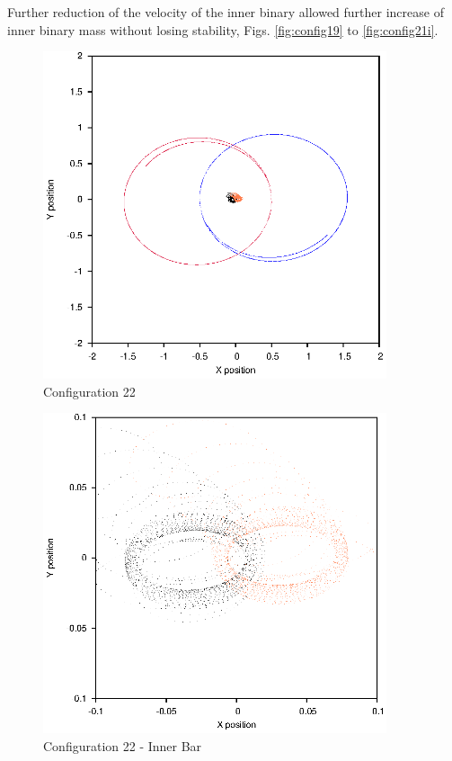 \documentclass[a4paper,12pt]{article}
\begin{document}
Further reduction of the velocity of the inner binary allowed further increase of inner binary mass without losing stability, Figs. \ref{fig:config19} to \ref{fig:config21i}.

\begin{figure}[H]
\centering
\includegraphics[width=0.9\textwidth]{./2017results/1-1-1-05/Orbit.eps}
\caption{Configuration 22}
\label{fig:config22}
\end{figure}
\begin{figure}[H]
\centering
\includegraphics[width=0.9\textwidth]{./2017results/1-1-1-05/Inner.eps}
\caption{Configuration 22 - Inner Bar}
\label{fig:config22i}
\end{figure}
\end{document}
